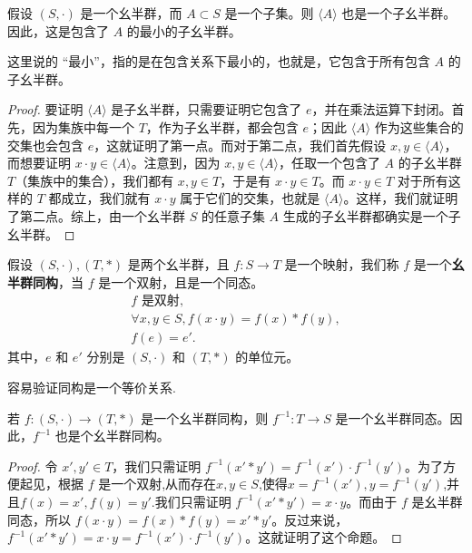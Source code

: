 \documentclass[../../main.tex]{subfiles}
\begin{document}
\begin{proposition}[由子集生成的子幺半群是包含了这个子集的最小的子幺半群]
假设 $(S, \cdot)$ 是一个幺半群，而 $A \subset S$ 是一个子集。则 $\langle A \rangle$ 也是一个子幺半群。因此，这是包含了 $A$ 的最小的子幺半群。
\end{proposition}
\begin{remark}
这里说的 “最小”，指的是在包含关系下最小的，也就是，它包含于所有包含 $A$ 的子幺半群。
\end{remark}
\begin{proof}
要证明 $\langle A \rangle$ 是子幺半群，只需要证明它包含了 $e$，并在乘法运算下封闭。首先，因为集族中每一个 $T$，作为子幺半群，都会包含 $e$；因此 $\langle A \rangle$ 作为这些集合的交集也会包含 $e$，这就证明了第一点。而对于第二点，我们首先假设 $x, y \in \langle A \rangle$，而想要证明 $x \cdot y \in \langle A \rangle$。注意到，因为 $x, y \in \langle A \rangle$，任取一个包含了 $A$ 的子幺半群 $T$（集族中的集合），我们都有 $x, y \in T$，于是有 $x \cdot y \in T$。而 $x \cdot y \in T$ 对于所有这样的 $T$ 都成立，我们就有 $x \cdot y$ 属于它们的交集，也就是 $\langle A \rangle$。这样，我们就证明了第二点。综上，由一个幺半群 $S$ 的任意子集 $A$ 生成的子幺半群都确实是一个子幺半群。 
\end{proof}

\begin{definition}[幺半群同构]
假设 $(S, \cdot), (T, *)$ 是两个幺半群，且 $f : S \to T$ 是一个映射，我们称 $f$ 是一个\textbf{幺半群同构}，当 $f$ 是一个双射，且是一个同态。
\begin{gather*}
f \text{ 是双射} ,\\
\forall x, y \in S, f(x \cdot y) = f(x) * f(y) ,\\
f(e) = e' .
\end{gather*}
其中，$e$ 和 $e'$ 分别是 $(S, \cdot)$ 和 $(T, *)$ 的单位元。 
\end{definition}
\begin{remark}
容易验证同构是一个等价关系.
\end{remark}

\begin{proposition}[幺半群同构的逆是幺半群同态]\label{proposition:幺半群同构的逆是幺半群同态}
若 $f : (S, \cdot) \to (T, *)$ 是一个幺半群同构，则 $f^{-1} : T \to S$ 是一个幺半群同态。因此，$f^{-1}$ 也是个幺半群同构。
\end{proposition}
\begin{proof}
令 $x', y' \in T$，我们只需证明 $f^{-1}(x' * y') = f^{-1}(x') \cdot f^{-1}(y')$。为了方便起见，根据 $f$ 是一个双射,从而存在$x,y\in S$,使得$x = f^{-1}(x'), y = f^{-1}(y')$,并且$f(x)=x',f(y)=y'$.我们只需证明 $f^{-1}(x' * y') = x \cdot y$。而由于 $f$ 是幺半群同态，所以 $f(x \cdot y) = f(x) * f(y) = x' * y'$。反过来说，$f^{-1}(x' * y') = x \cdot y = f^{-1}(x') \cdot f^{-1}(y')$。这就证明了这个命题。 
\end{proof}
\end{document}
